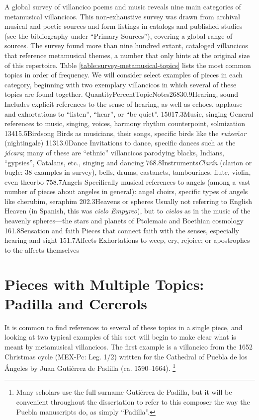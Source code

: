 \documentclass[oneside,12pt]{book}
\begin{document}
      A global survey of villancico poems and music reveals nine main categories of metamusical villancicos.
      This non-exhaustive survey was drawn from archival musical and poetic sources and form listings in catalogs and published studies (see the bibliography under \enquote{Primary Sources}), covering a global range of sources.
      The survey found more than nine hundred extant, cataloged villancicos that reference metamusical themes, a number that only hints at the original size of this repertoire.
      Table \ref{table:survey-metamusical-topics} lists the most common topics in order of frequency.
      We will consider select examples of pieces in each category, beginning with two exemplary villancicos in which several of these topics are found together.
    QuantityPercentTopicNotes26830.9Hearing, sound
	  Includes explicit references to the sense of hearing, as well as echoes, applause and exhortations to \enquote{listen}, \enquote{hear}, or \enquote{be quiet}.
	15017.3Music, singing
	  General references to music, singing, voices, harmony rhythm counterpoint, solmization
	13415.5Birdsong
	  Birds as musicians, their songs, specific birds like the \emph{ruiseñor} (nightingale)
	11313.0Dance
	  Invitations to dance, specific dances such as the \emph{jácara}; many of these are \enquote{ethnic} villancicos parodying blacks, Indians, \enquote{gypsies}, Catalans, etc., singing and dancing
	768.8Instruments\emph{Clarín} (clarion or bugle: 38 examples in survey), bells, drums, castanets, tambourines, flute, violin, even theorbo
	758.7Angels
	  Specifically musical references to angels (among a vast number of pieces about angeles in general): angel choirs, specific types of angels like cherubim, seraphim
	202.3Heavens or spheres
	  Usually not referring to English Heaven (in Spanish, this was \emph{cielo Empyreo}), but to \emph{cielos} as in the music of the heavenly spheres—the stars and planets of Ptolemaic and Boethian cosmology
	161.8Sensation and faith
	  Pieces that connect faith with the senses, especially hearing and sight
	151.7Affects
	  Exhortations to weep, cry, rejoice; or apostrophes to the affects themselves
	
\section{Pieces with Multiple Topics: Padilla and Cererols}
\label{ch1:multiple-topics}

      It is common to find references to several of these topics in a single piece, and looking at two typical examples of this sort will begin to make clear what is meant by metamusical villancicos.
      The first example is a villancico from the 1652 Christmas cycle (MEX-Pc: Leg. 1/2) written for the Cathedral of Puebla de los Ángeles by Juan Gutiérrez de Padilla (ca. 1590–1664).%
\footnote{
	Many scholars use the full surname Gutiérrez de Padilla, but it will be convenient throughout the dissertation to refer to this composer the way the Puebla manuscripts do, as simply \enquote{Padilla}.
	}
      
\end{document}
